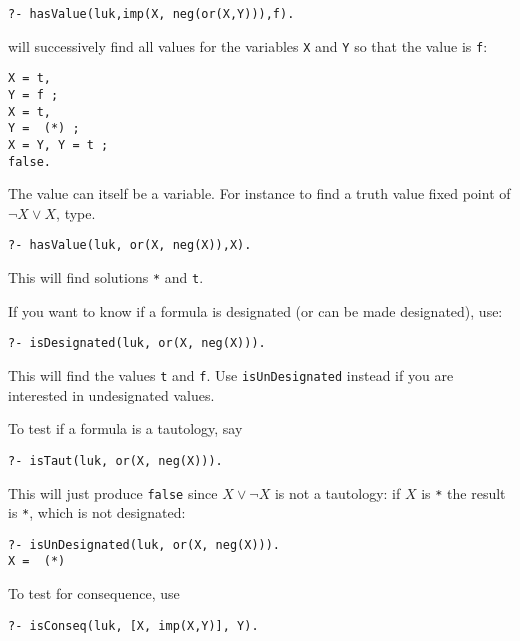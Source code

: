 \documentclass[
]{article}
\newcommand{\passthrough}[1]{#1}
\begin{document}
\begin{lstlisting}
?- hasValue(luk,imp(X, neg(or(X,Y))),f).
\end{lstlisting}

will successively find all values for the variables
\passthrough{\lstinline!X!} and \passthrough{\lstinline!Y!} so that the
value is \passthrough{\lstinline!f!}:

\begin{lstlisting}
X = t,
Y = f ;
X = t,
Y =  (*) ;
X = Y, Y = t ;
false.
\end{lstlisting}

The value can itself be a variable. For instance to find a truth value
fixed point of \(\lnot X \lor X\), type.

\begin{lstlisting}
?- hasValue(luk, or(X, neg(X)),X).
\end{lstlisting}

This will find solutions \passthrough{\lstinline!*!} and
\passthrough{\lstinline!t!}.

If you want to know if a formula is designated (or can be made
designated), use:

\begin{lstlisting}
?- isDesignated(luk, or(X, neg(X))).
\end{lstlisting}

This will find the values \passthrough{\lstinline!t!} and
\passthrough{\lstinline!f!}. Use
\passthrough{\lstinline!isUnDesignated!} instead if you are interested
in undesignated values.

To test if a formula is a tautology, say

\begin{lstlisting}
?- isTaut(luk, or(X, neg(X))).
\end{lstlisting}

This will just produce \passthrough{\lstinline!false!} since
\(X \lor \lnot X\) is not a tautology: if \(X\) is
\passthrough{\lstinline!*!} the result is \passthrough{\lstinline!*!},
which is not designated:

\begin{lstlisting}
?- isUnDesignated(luk, or(X, neg(X))).
X =  (*) 
\end{lstlisting}

To test for consequence, use

\begin{lstlisting}
?- isConseq(luk, [X, imp(X,Y)], Y).
\end{lstlisting}
\end{document}
